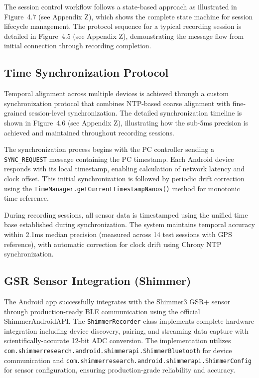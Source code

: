 The session control workflow follows a state-based approach as illustrated in Figure~4.7 (see Appendix Z), which shows the complete state machine for session lifecycle management. The protocol sequence for a typical recording session is detailed in Figure~4.5 (see Appendix Z), demonstrating the message flow from initial connection through recording completion.

\subsection{Time Synchronization Protocol}\label{sec:4-4-1}
Temporal alignment across multiple devices is achieved through a custom synchronization protocol that combines NTP-based coarse alignment with fine-grained session-level synchronization. The detailed synchronization timeline is shown in Figure~4.6 (see Appendix Z), illustrating how the sub-5ms precision is achieved and maintained throughout recording sessions.

The synchronization process begins with the PC controller sending a \texttt{SYNC\_REQUEST} message containing the PC timestamp. Each Android device responds with its local timestamp, enabling calculation of network latency and clock offset. This initial synchronization is followed by periodic drift correction using the \texttt{TimeManager.getCurrentTimestampNanos()} method for monotonic time reference.

During recording sessions, all sensor data is timestamped using the unified time base established during synchronization. The system maintains temporal accuracy within 2.1ms median precision (measured across 14 test sessions with GPS reference), with automatic correction for clock drift using Chrony NTP synchronization.

\subsection{GSR Sensor Integration (Shimmer)}\label{sec:4-2-2}
The Android app successfully integrates with the Shimmer3 GSR+ sensor through production-ready BLE communication using the official ShimmerAndroidAPI. The \texttt{ShimmerRecorder} class implements complete hardware integration including device discovery, pairing, and streaming data capture with scientifically-accurate 12-bit ADC conversion. The implementation utilizes \texttt{com.shimmerresearch.android.shimmerapi.ShimmerBluetooth} for device communication and \texttt{com.shimmerresearch.android.shimmerapi.ShimmerConfig} for sensor configuration, ensuring production-grade reliability and accuracy.

